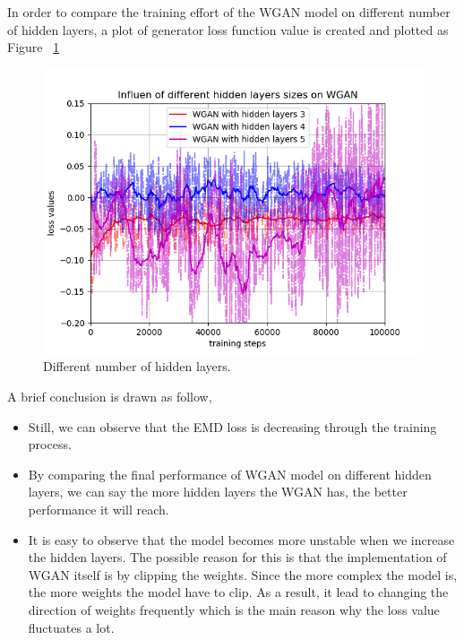 \documentclass[12pt,letterpaper]{article}
\begin{document}
In order to compare the training effort of the WGAN model on different number of hidden layers, a plot of generator loss function value is created and plotted as Figure ~\ref{fig:wgen_hidden}

\begin{figure}[h]
    \centering
    \includegraphics[width=.6\linewidth]{WGAN_MNIST_hidden.png}
    \caption{\small Different number of hidden layers.}
    \label{fig:wgen_hidden}
\end{figure}




A brief conclusion is drawn as follow,
\begin{itemize}
    \item Still, we can observe that the EMD loss is decreasing through the training process.
    \item By comparing the final performance of WGAN model on different hidden layers, we can say the more hidden layers the WGAN has, the better performance it will reach.
    \item It is easy to observe that the model becomes more unstable when we increase the hidden layers. The possible reason for this is that the implementation of WGAN itself is by clipping the weights. Since the more complex the model is, the more weights the model have to clip. As a result, it lead to changing the direction of weights frequently which is the main reason why the loss value fluctuates a lot.
\end{itemize}

\end{document}
